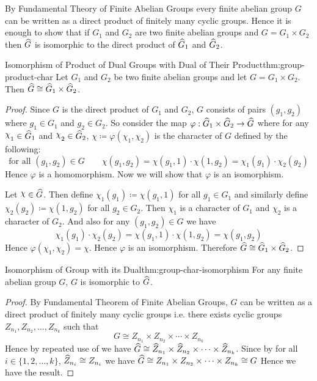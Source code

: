 By Fundamental Theory of Finite Abelian Groups every finite abelian group $G$ can be written as a direct product of finitely many cyclic groups. Hence it is enough to show that if $G_1$ and $G_2$ are two finite abelian groups and $G=G_1\times G_2$ then $\widehat{G}$ is isomorphic to the direct product of $\widehat{G}_1$ and $\widehat{G}_2$.
\begin{Theorem}{Isomorphism of Product of Dual Groups with Dual of Their Product}{thm:group-product-char}
  Let $G_1$ and $G_2$ be two finite abelian groups and let $G=G_1\times G_2$. Then $\widehat{G}\cong \widehat{G}_1\times \widehat{G}_2$.
\end{Theorem}
\begin{proof}
  Since $G$ is the direct product of $G_1$ and $G_2$, $G$ consists of pairs $(g_1,g_2)$ where $g_1\in G_1$ and $g_2\in G_2$. So consider the map $\varphi:\widehat{G}_1\times \widehat{G}_2\to \widehat{G}$ where for any $\chi_1\in \hG_1$ and $\chi_2\in \hG_2$, $\chi\coloneqq \varphi(\chi_1,\chi_2)$ is the character of $G$ defined by the following: $$\text{for all }(g_1,g_2)\in G\qquad \chi(g_1,g_2)=\chi(g_1,1)\cdot \chi(1,g_2)=\chi_1(g_1)\cdot \chi_2(g_2)$$Hence $\varphi$ is a homomorphism. Now we will show that $\varphi$ is an isomorphism.

  Let $\chi\in \hG$. Then define $\chi_1(g_1)\coloneqq\chi(g_1,1)$ for all $g_1\in G_1$ and similarly define $\chi_2(g_2)\coloneqq\chi(1,g_2)$ for all $g_2\in G_2$. Then $\chi_1$ is a character of $G_1$ and $\chi_2$ is a character of $G_2$. And also for any $(g_1,g_2)\in G$ we have $$\chi_1(g_1)\cdot \chi_2(g_2)=\chi(g_1,1)\cdot \chi(1,g_2)=\chi(g_1,g_2)$$ Hence $\varphi(\chi_1,\chi_2)=\chi$. Hence $\varphi$ is an isomorphism. Therefore $\widehat{G}\cong \widehat{G}_1\times \widehat{G}_2$.
\end{proof}

\begin{Theorem}{Isomorphism of Group with its Dual}{thm:group-char-isomorphism}
  For any finite abelian group $G$, $G$ is isomorphic to $\widehat{G}$.
\end{Theorem}
\begin{proof}
  By Fundamental Theorem of Finite Abelian Groups, $G$ can be written as a direct product of finitely many cyclic groups i.e. there exists cyclic groups $Z_{n_1},Z_{n_2},\dots, Z_{n_k}$ such that $$G\cong Z_{n_1}\times Z_{n_2}\times \cdots \times Z_{n_k}$$ Hence by repeated use of  we have $\widehat{G}\cong \widehat{Z}_{n_1}\times \widehat{Z}_{n_2}\times \cdots \times \widehat{Z}_{n_k}$. Since by  for all $i\in\{1,2,\dots, k\}$, $\widehat{Z}_{n_i}\cong Z_{n_i}$ we have $\widehat{G}\cong Z_{n_1}\times Z_{n_2}\times \cdots \times Z_{n_k}\cong G$ Hence we have the result.
\end{proof}